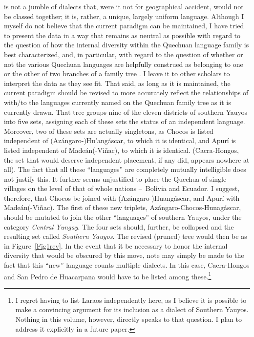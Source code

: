 \SYQ{} is not a jumble of dialects that, were it not for geographical accident, would not be classed together; it is, rather, a unique, largely uniform language. Although I myself do not believe that the current paradigm can be maintained, I have tried to present the data in a way that remains as neutral as possible with regard to the question of how the internal diversity within the Quechuan language family is best characterized, and, in particular, with regard to the question of whether or not the various Quechuan languages are helpfully construed as belonging to one or the other of two branches of a family tree \citep[See in particular][]{Adelaar08}. I leave it to other scholars to interpret the data as they see fit. That said, as long as it is maintained, the current paradigm should be revised to more accurately reflect the relationships of \SYQ{} with/to the languages currently named on the Quechuan family tree as it is currently drawn. That tree groups nine of the eleven districts of southern Yauyos into five sets, assigning each of these sets the status of an independent language. Moreover, two of these sets are actually singletons, as Chocos is listed independent of \mbox{(Azángaro-)}Hu’angáscar, to which it is identical, and Apurí is listed independent of Madeán(-Viñac), to which it is identical. (Cacra-Hongos, the set that would deserve independent placement, if any did, appears nowhere at all). The fact that all these “languages” are completely mutually intelligible does not justify this. It further seems unjustified to place the Quechua of single villages on the level of that of whole nations --~Bolivia and Ecuador. I suggest, therefore, that Chocos be joined with \mbox{(Azángaro-)}Huangáscar, and Apurí with Madeán(-Viñac). The first of these new triplets, Azángaro-Chocos-Hunagáscar, should be mutated to join the other “languages” of southern Yauyos, under the category \textit{Central Yungay}. The four sets should, further, be collapsed and the resulting set called \textit{Southern Yauyos}. The revised (pruned) tree would then be as in Figure~\ref{Fig1rev}. In the event that it be necessary to honor the internal diversity that would be obscured by this move, note may simply be made to the fact that this “new” language counts multiple dialects. In this case, Cacra-Hongos and San Pedro de Huacarpana would have to be listed among these.\footnote{I regret having to list Laraos independently here, as I believe it is possible to make a convincing argument for its inclusion as a dialect of Southern Yauyos. Nothing in this volume, however, directly speaks to that question. I plan to address it explicitly in a future paper.}

